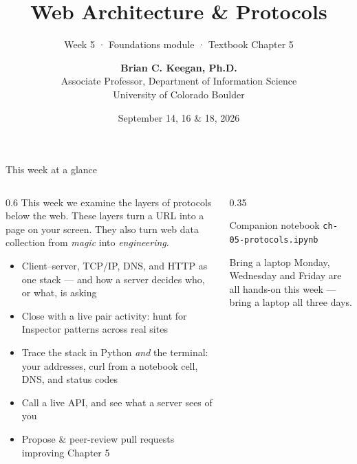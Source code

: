 \documentclass[9pt,aspectratio=169]{beamer}
\title[Week 5 · Protocols]{{\Huge Web Architecture \& Protocols}}
\subtitle{Week 5 · Foundations module · Textbook Chapter 5}
\author[Keegan]{\textbf{Brian C. Keegan, Ph.D.} \\ Associate Professor, Department of Information Science \\ University of Colorado Boulder}
\date{September 14, 16 \& 18, 2026}
\begin{document}
\maketitle

\begin{frame}{This week at a glance}
    \begin{columns}[T]
        \begin{column}{0.6\textwidth}
            This week we examine the layers of protocols below the web. These layers turn a URL into a page on your screen. They also turn web data collection from \textit{magic} into \textit{engineering}.

            \bigskip

            \begin{itemize}\small
                \item Client--server, TCP/IP, DNS, and HTTP as one stack --- and how a server decides who, or what, is asking
                \item Close with a live pair activity: hunt for Inspector patterns across real sites
            \end{itemize}

            \medskip

            \begin{itemize}\small
                \item Trace the stack in Python \emph{and} the terminal: your addresses, curl from a notebook cell, DNS, and status codes
            \end{itemize}

            \medskip

            \begin{itemize}\small
                \item Call a live API, and see what a server sees of you
                \item Propose \& peer-review pull requests improving Chapter 5
            \end{itemize}
        \end{column}
        \begin{column}{0.35\textwidth}
            \begin{block}{Companion notebook}
                \footnotesize \texttt{ch-05-protocols.ipynb}
            \end{block}
            \begin{alertblock}{Bring a laptop}
                \footnotesize Monday, Wednesday and Friday are all hands-on this week --- bring a laptop all three days.
            \end{alertblock}
        \end{column}
    \end{columns}
\end{frame}
\end{document}
